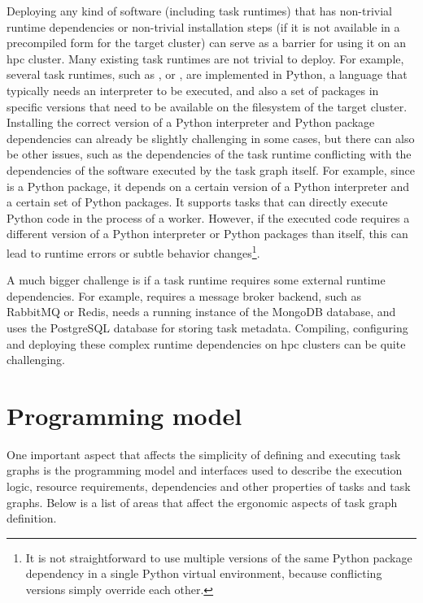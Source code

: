 Deploying any kind of software (including task runtimes) that has non-trivial runtime dependencies
or non-trivial installation steps (if it is not available in a precompiled form for the target
cluster) can serve as a barrier for using it on an \gls{hpc} cluster. Many existing
task runtimes are not trivial to deploy. For example, several task runtimes, such as
\dask{}, \snakemake{} or \pycompss{}, are implemented in
Python, a language that typically needs an interpreter to be executed, and also a set of packages
in specific versions that need to be available on the filesystem of the target cluster. Installing
the correct version of a Python interpreter and Python package dependencies can already be slightly
challenging in some cases, but there can also be other issues, such as the dependencies of the task
runtime conflicting with the dependencies of the software executed by the task graph itself. For
example, since \dask{} is a Python package, it depends on a certain version of a
Python interpreter and a certain set of Python packages. It supports tasks that can directly
execute Python code in the process of a \dask{} worker. However, if the executed
code requires a different version of a Python interpreter or Python packages than
\dask{} itself, this can lead to runtime errors or subtle behavior
changes\footnote{It is not straightforward to use multiple versions of the same Python package dependency in a
single Python virtual environment, because conflicting versions simply override each other.}.

A much bigger challenge is if a task runtime requires some external runtime dependencies. For
example, \merlin{} requires a message broker backend, such as RabbitMQ or Redis,
\fireworks{} needs a running instance of the MongoDB database, and
\balsam{} uses the PostgreSQL database for storing task metadata. Compiling,
configuring and deploying these complex runtime dependencies on \gls{hpc} clusters
can be quite challenging.

\section{Programming model}
One important aspect that affects the simplicity of defining and executing task graphs is the
programming model and interfaces used to describe the execution logic, resource requirements,
dependencies and other properties of tasks and task graphs. Below is a list of areas that affect
the ergonomic aspects of task graph definition.

